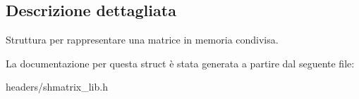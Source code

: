 \subsection{Descrizione dettagliata}
Struttura per rappresentare una matrice in memoria condivisa. 

La documentazione per questa struct è stata generata a partire dal seguente file\+:\begin{DoxyCompactItemize}
\item 
headers/shmatrix\+\_\+lib.\+h\end{DoxyCompactItemize}
